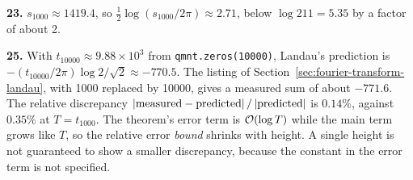 \textbf{23.} $s_{1000}\approx1419.4$, so $\frac12\log(s_{1000}/2\pi)\approx2.71$, below $\log211=5.35$ by a factor of about 2.

\textbf{25.} With $t_{10000}\approx9.88\times10^3$ from \texttt{qmnt.zeros(10000)}, Landau's prediction is $-(t_{10000}/2\pi)\log2/\sqrt2\approx-770.5$. The listing of Section~\ref{sec:fourier-transform-landau}, with 1000 replaced by 10000, gives a measured sum of about $-771.6$. The relative discrepancy $\left\lvert \text{measured}-\text{predicted}\right\rvert/\left\lvert \text{predicted}\right\rvert$ is $0.14\%$, against $0.35\%$ at $T=t_{1000}$. The theorem's error term is $\mathcal{O}(\log T)$ while the main term grows like $T$, so the relative error \emph{bound} shrinks with height. A single height is not guaranteed to show a smaller discrepancy, because the constant in the error term is not specified.
